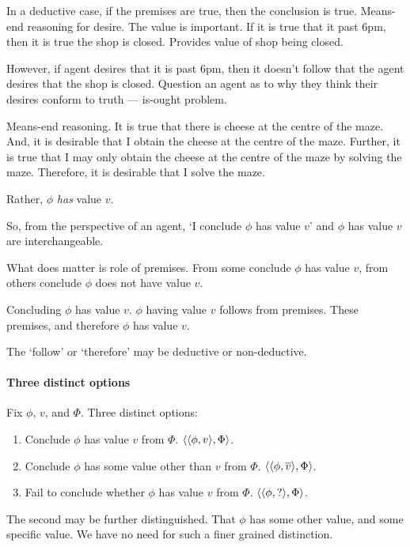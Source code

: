 \begin{note}
  In a deductive case, if the premises are true, then the conclusion is true.
  Means-end reasoning for desire.
  The value is important.
  If it is true that it past 6pm, then it is true the shop is closed.
  Provides value of shop being closed.

  However, if agent desires that it is past 6pm, then it doesn't follow that the agent desires that the shop is closed.
  Question an agent as to why they think their desires conform to truth --- is-ought problem.

  Means-end reasoning.
  It is true that there is cheese at the centre of the maze.
  And, it is desirable that I obtain the cheese at the centre of the maze.
  Further, it is true that I may only obtain the cheese at the centre of the maze by solving the maze.
  Therefore, it is desirable that I solve the maze.
\end{note}

\begin{note}[`Concluding']
  Rather, \(\phi\) \emph{has} value \(v\).

  So, from the perspective of an agent, `I conclude \(\phi\) has value \(v\)' and \(\phi\) has value \(v\) are interchangeable.
\end{note}

\begin{note}
  What does matter is role of premises.
  From some conclude \(\phi\) has value \(v\), from others conclude \(\phi\) does not have value \(v\).
\end{note}

\begin{note}[Generally]
  Concluding \(\phi\) has value \(v\).
  \(\phi\) having value \(v\) follows from premises.
  These premises, and therefore \(\phi\) has value \(v\).

  The `follow' or `therefore' may be deductive or non-deductive.
\end{note}

\paragraph*{Three distinct options}

\begin{assumption}
  Fix \(\phi\), \(v\), and \(\Phi\).
  Three distinct options:
  \begin{enumerate}
  \item Conclude \(\phi\) has value \(v\) from \(\Phi\).
    \(\langle \langle \phi, v \rangle, \Phi \rangle\).
  \item
    Conclude \(\phi\) has some value other than \(v\) from \(\Phi\).
    \(\langle \langle \phi, \overline{v} \rangle, \Phi \rangle\).
  \item
    Fail to conclude whether \(\phi\) has value \(v\) from \(\Phi\).
    \(\langle \langle \phi, ? \rangle, \Phi \rangle\).
  \end{enumerate}
  The second may be further distinguished.
  That \(\phi\) has some other value, and some specific value.
  We have no need for such a finer grained distinction.
\end{assumption}


